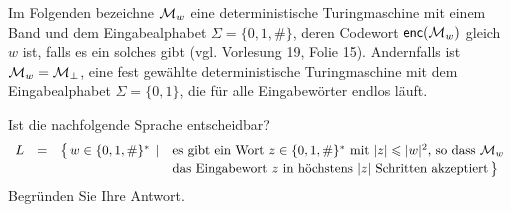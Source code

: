 \begin{exercise}
Im Folgenden bezeichne $\mathcal{M}_w$ eine deterministische 
Turingmaschine mit einem Band und dem Eingabe\-alphabet $\Sigma=\{0,1,\#\}$, deren Codewort $\textsf{enc}(\mathcal{M}_w)$ 
gleich $w$ ist, falls es ein solches gibt (vgl. Vorlesung 19, Folie 15).
Andernfalls ist $\mathcal{M}_w = \mathcal{M}_{\bot}$, eine fest 
gew\"ahlte deterministische Turingmaschine 
mit dem Eingabealphabet $\Sigma=\{0,1\}$, die f\"ur alle 
Eingabew\"orter endlos l\"auft.

Ist die nachfolgende Sprache entscheidbar?
\[
 \begin{array}{lcll}
  L & = & \bigl\{ \, w \in \{0,1,\#\}^* \, \mid &
  \mbox{es gibt ein Wort $z\in \{0,1,\#\}^*$ mit $|z| \leqslant |w|^2$,
        so dass $\mathcal{M}_w$} 
  \\[0.5ex]
  & & & 
  \mbox{das Eingabewort $z$ in h\"ochstens $|z|$ Schritten
        akzeptiert}
      \, \bigr\}
\end{array}
\]
Begr\"unden Sie Ihre Antwort.
\end{exercise}

